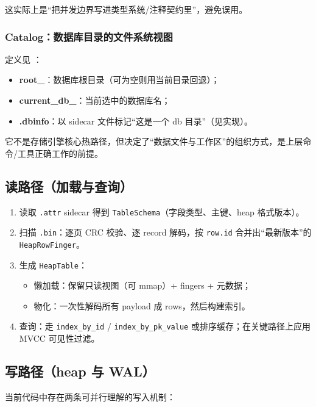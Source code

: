 这实际上是“把并发边界写进类型系统/注释契约里”，避免误用。

\subsubsection{Catalog：数据库目录的文件系统视图}

定义见 ：

\begin{itemize}
  \item \textbf{root\_}：数据库根目录（可为空则用当前目录回退）；
  \item \textbf{current\_db\_}：当前选中的数据库名；
  \item \textbf{.dbinfo}：以 sidecar 文件标记“这是一个 db 目录”（见实现）。
\end{itemize}

它不是存储引擎核心热路径，但决定了“数据文件与工作区”的组织方式，是上层命令/工具正确工作的前提。

\subsection{读路径（加载与查询）}

\begin{enumerate}
  \item 读取 \texttt{.attr} sidecar 得到 \texttt{TableSchema}（字段类型、主键、heap 格式版本）。
  \item 扫描 \texttt{.bin}：逐页 CRC 校验、逐 record 解码，按 \texttt{row.id} 合并出“最新版本”的 \texttt{HeapRowFinger}。
  \item 生成 \texttt{HeapTable}：
    \begin{itemize}
      \item 懒加载：保留只读视图（可 mmap）+ fingers + 元数据；
      \item 物化：一次性解码所有 payload 成 rows，然后构建索引。
    \end{itemize}
  \item 查询：走 \texttt{index\_by\_id} / \texttt{index\_by\_pk\_value} 或排序缓存；在关键路径上应用 MVCC 可见性过滤。
\end{enumerate}

\subsection{写路径（heap 与 WAL）}

当前代码中存在两条可并行理解的写入机制：

